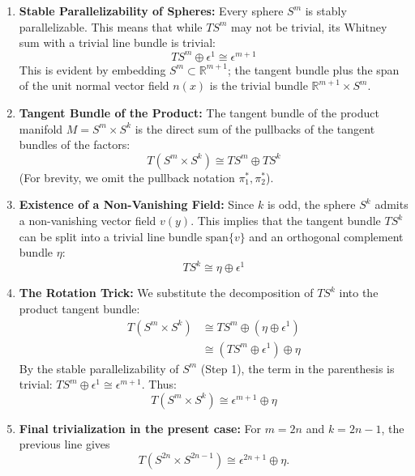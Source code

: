 \begin{solution}
\begin{enumerate}
    \item \textbf{Stable Parallelizability of Spheres:} Every sphere $S^m$ is stably parallelizable. This means that while $TS^m$ may not be trivial, its Whitney sum with a trivial line bundle is trivial:
    \begin{equation*}
        TS^m \oplus \epsilon^1 \cong \epsilon^{m+1}
    \end{equation*}
    This is evident by embedding $S^m \subset \mathbb{R}^{m+1}$; the tangent bundle plus the span of the unit normal vector field $n(x)$ is the trivial bundle $\mathbb{R}^{m+1} \times S^m$.
    \item \textbf{Tangent Bundle of the Product:} The tangent bundle of the product manifold $M = S^m \times S^k$ is the direct sum of the pullbacks of the tangent bundles of the factors:
    \begin{equation*}
        T(S^m \times S^k) \cong TS^m \oplus TS^k
    \end{equation*}
    (For brevity, we omit the pullback notation $\pi_1^*, \pi_2^*$).
    \item \textbf{Existence of a Non-Vanishing Field:} Since $k$ is odd, the sphere $S^k$ admits a non-vanishing vector field $v(y)$. This implies that the tangent bundle $TS^k$ can be split into a trivial line bundle $\text{span}\{v\}$ and an orthogonal complement bundle $\eta$:
    \begin{equation*}
        TS^k \cong \eta \oplus \epsilon^1
    \end{equation*}
    \item \textbf{The Rotation Trick:} We substitute the decomposition of $TS^k$ into the product tangent bundle:
    \begin{align*}
        T(S^m \times S^k) &\cong TS^m \oplus (\eta \oplus \epsilon^1) \\
        &\cong (TS^m \oplus \epsilon^1) \oplus \eta
    \end{align*}
    By the stable parallelizability of $S^m$ (Step 1), the term in the parenthesis is trivial: $TS^m \oplus \epsilon^1 \cong \epsilon^{m+1}$. Thus:
    \begin{equation*}
        T(S^m \times S^k) \cong \epsilon^{m+1} \oplus \eta
    \end{equation*}
    \item \textbf{Final trivialization in the present case:} For
    $m=2n$ and $k=2n-1$, the previous line gives
    \[
        T(S^{2n}\times S^{2n-1})
        \cong
        \epsilon^{2n+1}\oplus \eta.
\]
\end{enumerate}
\end{solution}

